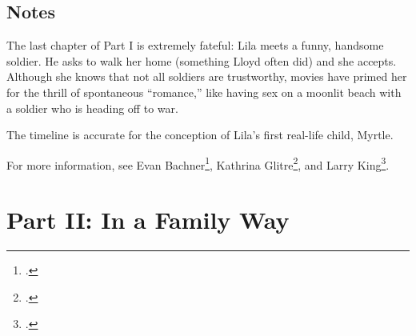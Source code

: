 \documentclass[
  letterpaper,
]{book}
\begin{document}
\section{Notes}\label{notes-30}

The last chapter of Part I is extremely fateful: Lila meets a funny,
handsome soldier. He asks to walk her home (something Lloyd often did)
and she accepts. Although she knows that not all soldiers are
trustworthy, movies have primed her for the thrill of spontaneous
``romance,'' like having sex on a moonlit beach with a soldier who is
heading off to war.

The timeline is accurate for the conception of Lila's first real-life
child, Myrtle.

For more information, see Evan Bachner\footnote{.},
Kathrina Glitre\footnote{.}, and Larry King\footnote{.}.


\chapter{Part II: In a Family Way}\label{part-ii-in-a-family-way}
\end{document}
